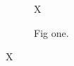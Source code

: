 \documentclass[sigconf]{acmart}
\begin{document}
\begin{figure}X\caption{Fig one.}\end{figure}
\begin{table}\caption{Tab one.}X\end{table}
\end{document}
